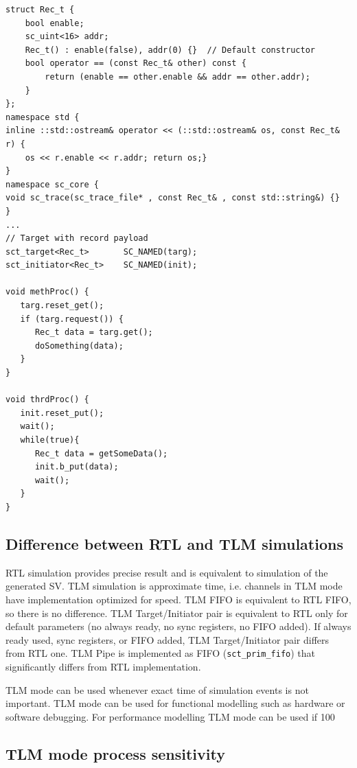 \begin{lstlisting}[style=mycpp]
struct Rec_t {
    bool enable;
    sc_uint<16> addr;   
    Rec_t() : enable(false), addr(0) {}  // Default constructor
    bool operator == (const Rec_t& other) const {
        return (enable == other.enable && addr == other.addr);
    }
};
namespace std {
inline ::std::ostream& operator << (::std::ostream& os, const Rec_t& r) {
    os << r.enable << r.addr; return os;}
}
namespace sc_core {
void sc_trace(sc_trace_file* , const Rec_t& , const std::string&) {}
}
...
// Target with record payload
sct_target<Rec_t>   	SC_NAMED(targ);
sct_initiator<Rec_t>    SC_NAMED(init);

void methProc() {
   targ.reset_get();
   if (targ.request()) {
      Rec_t data = targ.get();
      doSomething(data);
   }
}

void thrdProc() {
   init.reset_put();
   wait();
   while(true){
      Rec_t data = getSomeData();
      init.b_put(data);
      wait();
   }
}

\end{lstlisting}



\subsection{Difference between RTL and TLM simulations}\label{section:diff_tlm_rtl}

RTL simulation provides precise result and is equivalent to simulation of the generated SV. TLM simulation is approximate time, i.e. channels in TLM mode have implementation optimized for speed. TLM FIFO is equivalent to RTL FIFO, so there is no difference. TLM Target/Initiator pair is equivalent to RTL only for default parameters (no always ready, no sync registers, no FIFO added). If always ready used, sync registers, or FIFO added, TLM Target/Initiator pair differs from RTL one. TLM Pipe is implemented as FIFO ({\tt sct\_prim\_fifo}) that significantly differs from RTL implementation.

TLM mode can be used whenever exact time of simulation events is not important. TLM mode can be used for functional modelling such as hardware or software debugging. For performance modelling TLM mode can be used if 100%



\subsection{TLM mode process sensitivity}

